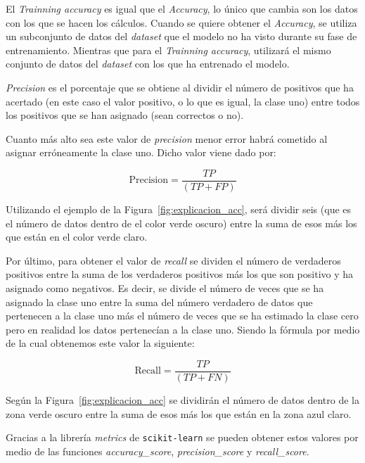 \documentclass[a4paper, 12pt]{book}
\begin{document}
El \textit{Trainning accuracy} es igual que el \textit{Accuracy}, lo único que cambia son los datos con los que se hacen los cálculos. Cuando se quiere obtener el \textit{Accuracy}, se utiliza un subconjunto de datos del \textit{dataset} que el modelo no ha visto durante su fase de entrenamiento. Mientras que para el \textit{Trainning accuracy}, utilizará el mismo conjunto de datos del \textit{dataset} con los que ha entrenado el modelo.

\textit{Precision} es el porcentaje que se obtiene al dividir el número de positivos que ha acertado (en este caso el valor positivo, o lo que es igual, la clase uno) entre todos los positivos que se han asignado (sean correctos o no). 

Cuanto más alto sea este valor de \textit{precision} menor error habrá cometido al asignar erróneamente la clase uno. Dicho valor viene dado por:

\begin{equation}
\label{eqn:accuracy} 
 \boxed{\mbox{Precision} = \frac{TP}{(TP + FP)}}
\end{equation}

Utilizando el ejemplo de la Figura~\ref{fig:explicacion_acc}, será dividir seis (que es el número de datos dentro de el color verde oscuro) entre la suma de esos más los que están en el color verde claro.

Por último, para obtener el valor de \textit{recall} se dividen el número de verdaderos positivos entre la suma de los verdaderos positivos más los que son positivo y ha asignado como negativos. Es decir, se divide el número de veces que se ha asignado la clase uno entre la suma del número verdadero de datos que pertenecen a la clase uno más el número de veces que se ha estimado la clase cero pero en realidad los datos pertenecían a la clase uno. Siendo la fórmula por medio de la cual obtenemos este valor la siguiente:

\begin{equation}
 \boxed{\mbox{Recall} = \frac{TP}{(TP + FN)}}
\end{equation}

Según la Figura~\ref{fig:explicacion_acc} se dividirán el número de datos dentro de la zona verde oscuro entre la suma de esos más los que están en la zona azul claro.

Gracias a la librería \textit{metrics} de \texttt{scikit-learn} se pueden obtener estos valores por medio de las funciones \textit{accuracy\_score}, \textit{precision\_score} y \textit{recall\_score}. 
\end{document}
